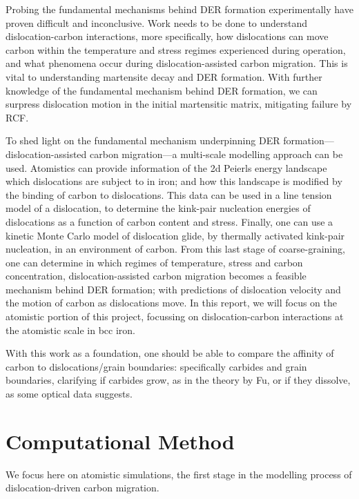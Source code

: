 \documentclass[a4paper,11pt]{article}
\begin{document}
Probing the fundamental mechanisms behind DER formation experimentally have proven difficult and
inconclusive. Work needs to be done to understand dislocation-carbon interactions, more specifically, how
dislocations can move carbon within the temperature and stress regimes experienced during
operation, and what phenomena occur during dislocation-assisted carbon migration. This is vital to
understanding martensite decay and DER formation. With further knowledge of the fundamental
mechanism behind DER formation, we can surpress dislocation motion in the initial martensitic
matrix, mitigating failure by RCF.

To shed light on the fundamental mechanism underpinning DER
formation---dislocation-assisted carbon migration---a multi-scale modelling approach can be
used. Atomistics can provide information of the 2d Peierls energy landscape which dislocations are
subject to in iron; and how this landscape is modified by the binding of carbon to
dislocations. This data can be used in a line tension model of a dislocation, to determine the
kink-pair nucleation energies of dislocations as a function of carbon content and stress. Finally,
one can use a kinetic Monte Carlo model of dislocation glide, by thermally activated kink-pair
nucleation, in an environment of carbon. From this last stage of coarse-graining, one can
determine in which regimes of temperature, stress and carbon concentration, dislocation-assisted
carbon migration becomes a feasible mechanism behind DER formation; with predictions of
dislocation velocity and the motion of carbon as dislocations move. In this report, we will focus
on the atomistic portion of this project, focussing on dislocation-carbon interactions at the
atomistic scale in bcc iron.

With this work as a foundation, one should be able to compare the affinity of carbon to
dislocations/grain boundaries: specifically carbides and grain boundaries, clarifying if carbides
grow, as in the theory by Fu, or if they dissolve, as some optical data suggests. 







\section{Computational Method}
\label{sec:orgdd13498}

We focus here on atomistic simulations, the first stage in the modelling process of
dislocation-driven carbon migration. 
\end{document}
